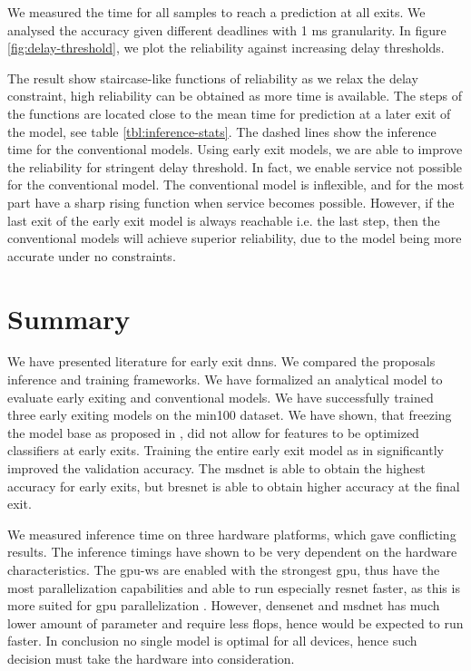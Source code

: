 We measured the time for all samples to reach a prediction at all exits. We analysed the accuracy given different deadlines with 1 ms granularity. In figure \ref{fig:delay-threshold}, we plot the reliability against increasing delay thresholds.

The result show staircase-like functions of reliability as we relax the delay constraint, high reliability can be obtained as more time is available. The steps of the functions are located close to the mean time for prediction at a later exit of the model, see table \ref{tbl:inference-stats}. The dashed lines show the inference time for the conventional models. Using early exit models, we are able to  improve the reliability for stringent delay threshold. In fact, we enable service not possible for the conventional model. The conventional model is inflexible, and for the most part have a sharp rising function when service becomes possible. However, if the last exit of the early exit model is always reachable i.e. the last step, then the conventional models will achieve superior reliability, due to the model being more accurate under no constraints. 

\section{Summary} \label{sec:ee-summary}

We have presented literature for early exit \gls{dnn}s. We compared the proposals inference and training frameworks. We have formalized an analytical model to evaluate early exiting and conventional models. We have successfully trained three early exiting models on the \gls{min100} dataset. We have shown, that freezing the model base as proposed in \cite{leroux_resource-constrained_2015}, did not allow for features to be optimized classifiers at early exits. Training the entire early exit model as in \cite{teerapittayanon_branchynet:_2016} significantly improved the validation accuracy. The \gls{msdnet} is able to obtain the highest accuracy for early exits, but \gls{bresnet} is able to obtain higher accuracy at the final exit. 

We measured inference time on three hardware platforms, which gave conflicting results. The inference timings have shown to be very dependent on the hardware characteristics. The \gls{gpu-ws} are enabled with the strongest \gls{gpu}, thus have the most parallelization capabilities and able to run especially \gls{resnet} faster, as this is more suited for \gls{gpu} parallelization \cite{lee_energy_2019}. However, \gls{densenet} and \gls{msdnet} has much lower amount of parameter and require less \gls{flop}s, hence would be expected to run faster. In conclusion no single model is optimal for all devices, hence such decision must take the hardware into consideration.

